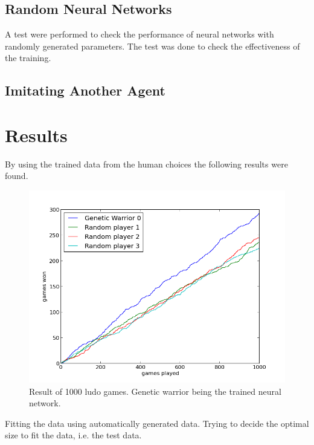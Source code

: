 \documentclass{llncs}
\begin{document}
 
\subsection*{Random Neural Networks}

A test were performed to check the performance of neural networks with randomly generated parameters. The test was done to check the effectiveness of the training.



\subsection*{Imitating Another Agent}




\section*{Results} %


By using the trained data from the human choices the following results were found.




\begin{figure}[t]
        \centering
		\includegraphics[scale=0.3]{../lillens_gener_unscaled_u.png} 
        \caption{ Result of 1000 ludo games. Genetic warrior being the trained neural network.}\label{fig:ligener}
\end{figure} 

Fitting the data using automatically generated data. Trying to decide the optimal size to fit the data, i.e. the test data.
\end{document}
